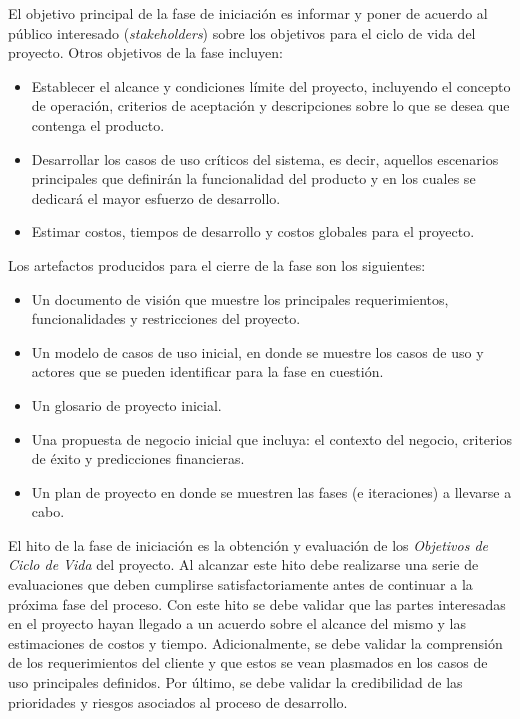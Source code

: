 El objetivo principal de la fase de iniciación es informar y poner de acuerdo al público interesado (\textit{stakeholders}) sobre los objetivos para el ciclo de vida del proyecto. Otros objetivos de la fase incluyen:

\begin{itemize}
    \item Establecer el alcance y condiciones límite del proyecto, incluyendo el concepto de operación, criterios de aceptación y descripciones sobre lo que se desea que contenga el producto.
    \item Desarrollar los casos de uso críticos del sistema, es decir, aquellos escenarios principales que definirán la funcionalidad del producto y en los cuales se dedicará el mayor esfuerzo de desarrollo.
    \item Estimar costos, tiempos de desarrollo y costos globales para el proyecto.
\end{itemize}

Los artefactos producidos para el cierre de la fase son los siguientes:

\begin{itemize}
    \item Un documento de visión que muestre los principales requerimientos, funcionalidades y restricciones del proyecto.
    \item Un modelo de casos de uso inicial, en donde se muestre los casos de uso y actores que se pueden identificar para la fase en cuestión.
    \item Un glosario de proyecto inicial.
    \item Una propuesta de negocio inicial que incluya: el contexto del negocio, criterios de éxito y predicciones financieras.
    \item Un plan de proyecto en donde se muestren las fases (e iteraciones) a llevarse a cabo.
\end{itemize}

El hito de la fase de iniciación es la obtención y evaluación de los \textit{Objetivos de Ciclo de Vida} del proyecto. Al alcanzar este hito debe realizarse una serie de evaluaciones que deben cumplirse satisfactoriamente antes de continuar a la próxima fase del proceso. Con este hito se debe validar que las partes interesadas en el proyecto hayan llegado a un acuerdo sobre el alcance del mismo y las estimaciones de costos y tiempo. Adicionalmente, se debe validar la comprensión de los requerimientos del cliente y que estos se vean plasmados en los casos de uso principales definidos. Por último, se debe validar la credibilidad de las prioridades y riesgos asociados al proceso de desarrollo.

